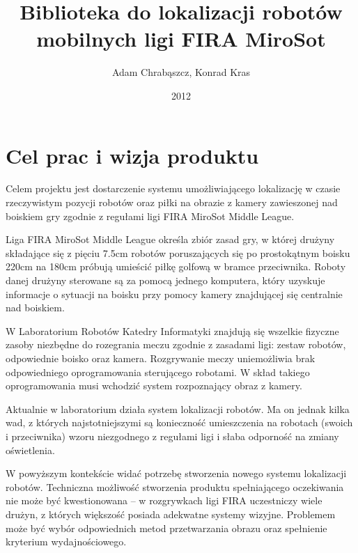 \documentclass[polish,12pt]{aghthesis}
\author{Adam Chrabąszcz, Konrad Kras}
\title{Biblioteka do lokalizacji robotów mobilnych ligi FIRA MiroSot}
\date{2012}
\begin{document}
\maketitle



\section{Cel prac i wizja produktu}
\label{sec:cel-wizja}
Celem projektu jest
dostarczenie systemu umożliwiającego lokalizację w czasie rzeczywistym
pozycji robotów oraz piłki na obrazie z kamery zawieszonej nad boiskiem gry zgodnie z
regułami ligi FIRA MiroSot Middle League.

Liga FIRA MiroSot Middle League określa zbiór zasad gry, w której drużyny
składające się z pięciu 7.5cm robotów poruszających się po prostokątnym boisku
220cm na 180cm próbują umieścić piłkę golfową w bramce przeciwnika. Roboty danej
drużyny sterowane są za pomocą jednego komputera, który uzyskuje informacje
o sytuacji na boisku przy pomocy kamery znajdującej się centralnie nad boiskiem.

W Laboratorium Robotów Katedry Informatyki znajdują się wszelkie fizyczne zasoby
niezbędne do rozegrania meczu zgodnie z zasadami ligi: zestaw robotów, 
odpowiednie boisko oraz kamera. Rozgrywanie meczy uniemożliwia brak
odpowiedniego oprogramowania sterującego robotami. W skład takiego
oprogramowania musi wchodzić system rozpoznający obraz z kamery.

Aktualnie w laboratorium działa system lokalizacji robotów. Ma on jednak kilka
wad, z których najstotniejszymi są konieczność umieszczenia na robotach
(swoich i przeciwnika) wzoru niezgodnego z regułami ligi
i słaba odporność na zmiany oświetlenia. 

W powyższym kontekście widać potrzebę stworzenia nowego systemu lokalizacji 
robotów. Techniczna możliwość stworzenia produktu spełniającego oczekiwania nie
może być kwestionowana -- w rozgrywkach ligi FIRA uczestniczy wiele drużyn, 
z których większość posiada adekwatne systemy wizyjne. Problemem może być wybór
odpowiednich metod przetwarzania obrazu oraz spełnienie kryterium
wydajnościowego.
\end{document}
